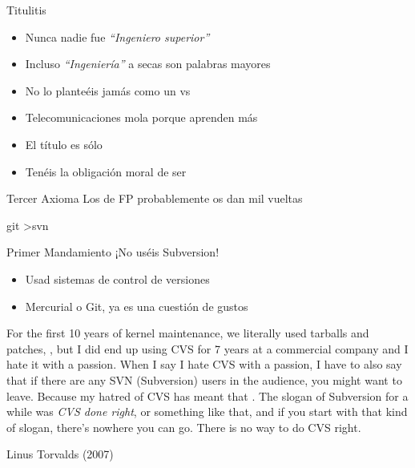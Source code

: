 \documentclass[14pt]{beamer}
\begin{document}
\begin{frame}{Titulitis}
  \begin{itemize}
    \item Nunca nadie fue \emph{``Ingeniero superior''}
    \item Incluso \emph{``Ingeniería''} a secas son palabras mayores
    \item No lo planteéis jamás como un  vs
    \item Telecomunicaciones mola porque aprenden más 
    \item El título es sólo 
    \item Tenéis la obligación moral de ser 
  \end{itemize}

  \begin{alertblock}{\centering Tercer Axioma}
    \centering Los de FP probablemente os dan mil vueltas
  \end{alertblock}
\end{frame}



\begin{frame}{git \textgreater svn}

  \begin{alertblock}{\centering Primer Mandamiento}
    \centering ¡No uséis Subversion!
  \end{alertblock}

  \begin{itemize} \itemsep0em
    \item Usad sistemas de control de versiones 
    \item Mercurial o Git, ya es una cuestión de gustos
  \end{itemize}

  \begin{block}{}\centering
    \scriptsize For the first 10 years of kernel maintenance, we
    literally used tarballs and patches, , but I
    did end up using CVS for 7 years at a commercial company and I
    hate it with a passion. When I say I hate CVS with a passion, I
    have to also say that if there are any SVN (Subversion) users in
    the audience, you might want to leave. Because my hatred of CVS
    has meant that . The slogan of Subversion for a
    while was \emph{CVS done right}, or something like that, and if
    you start with that kind of slogan, there's nowhere you can
    go. There is no way to do CVS right.
  \end{block}
  \vspace{-0.5cm}
  \begin{center} \scriptsize Linus Torvalds (2007) \end{center}
\end{frame}
\end{document}
